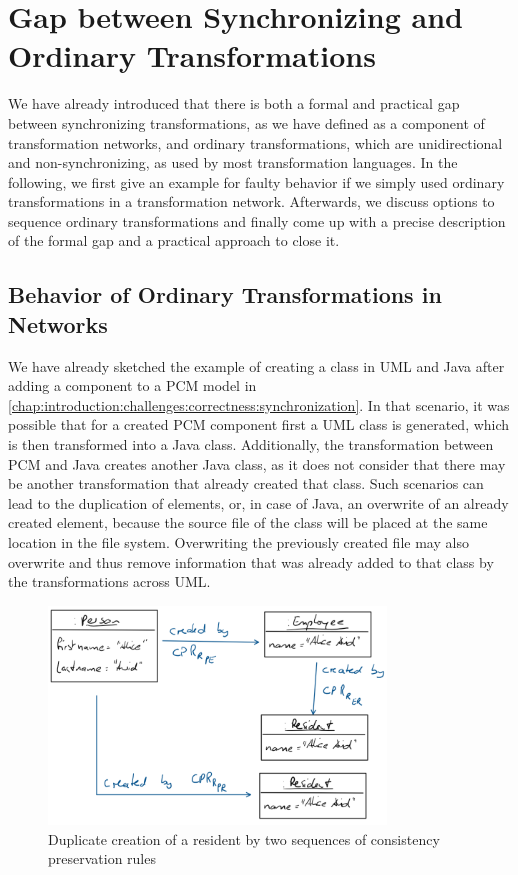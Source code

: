 \section{Gap between Synchronizing and Ordinary Transformations}

We have already introduced that there is both a formal and practical gap between synchronizing transformations, as we have defined as a component of transformation networks, and ordinary transformations, which are unidirectional and non-synchronizing, as used by most transformation languages.
In the following, we first give an example for faulty behavior if we simply used ordinary transformations in a transformation network.
Afterwards, we discuss options to sequence ordinary transformations and finally come up with a precise description of the formal gap and a practical approach to close it.

\subsection{Behavior of Ordinary Transformations in Networks}
We have already sketched the example of creating a class in UML and Java after adding a component to a \gls{PCM} model in \autoref{chap:introduction:challenges:correctness:synchronization}.
In that scenario, it was possible that for a created \gls{PCM} component first a UML class is generated, which is then transformed into a Java class.
Additionally, the transformation between \gls{PCM} and Java creates another Java class, as it does not consider that there may be another transformation that already created that class.
Such scenarios can lead to the duplication of elements, or, in case of Java, an overwrite of an already created element, because the source file of the class will be placed at the same location in the file system.
Overwriting the previously created file may also overwrite and thus remove information that was already added to that class by the transformations across UML.

\begin{figure}
    \centering
    \includegraphics[width=0.8\textwidth]{figures/correctness/synchronization/duplicate_creation_example.png}    
    \caption{Duplicate creation of a resident by two sequences of consistency preservation rules}
    \label{fig:synchronization:duplicate_creation_example}
\end{figure}

